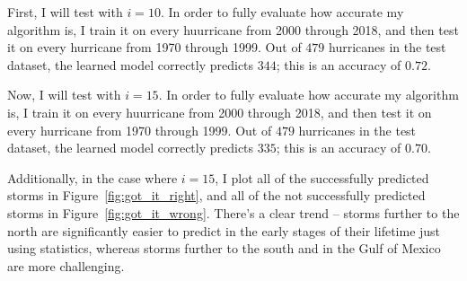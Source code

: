 \par
First, I will test with $i=10$.
In order to fully evaluate how accurate my algorithm is, I train it on every huurricane from 2000 through 2018, and then test it on every hurricane from 1970 through 1999.
Out of $479$ hurricanes in the test dataset, the learned model correctly predicts $344$; this is an accuracy of $0.72$.

\par
Now, I will test with $i=15$.
In order to fully evaluate how accurate my algorithm is, I train it on every huurricane from 2000 through 2018, and then test it on every hurricane from 1970 through 1999.
Out of $479$ hurricanes in the test dataset, the learned model correctly predicts $335$; this is an accuracy of $0.70$.

\par
Additionally, in the case where $i=15$, I plot all of the successfully predicted storms in Figure~\ref{fig:got_it_right}, and all of the not successfully predicted storms in Figure~\ref{fig:got_it_wrong}.
There's a clear trend -- storms further to the north are significantly easier to predict in the early stages of their lifetime just using statistics, whereas storms further to the south and in the Gulf of Mexico are more challenging.